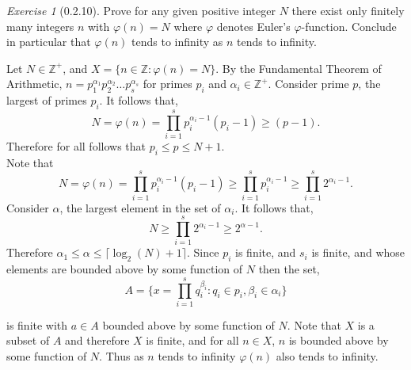 \documentclass[12pt]{amsart}
\makeatletter
\theoremstyle{remark}
\newtheorem*{exercise}{Exercise}%
\def\ZZ{\ensuremath{\mathbb Z}}
\renewenvironment{proof}[1][\proofname]{\par\doublespacing
  \pushQED{\qed}%
  \normalfont \topsep6\p@\@plus6\p@\relax
  \list{}{%
    \settowidth{\leftmargin}{\itshape\proofname:\hskip\labelsep}%
    \setlength{\labelwidth}{0pt}%
    \setlength{\itemindent}{-\leftmargin}%
  }%
  \item[\hskip\labelsep\itshape#1\@addpunct{:}]\ignorespaces
}{%
  \popQED\endlist\@endpefalse
  \singlespacing
}
\theoremstyle{mycomment}
\makeatother
\begin{document}
 
  \begin{exercise}[0.2.10] Prove for any given positive integer $N$ there exist only finitely many integers $n$ 
    with $\varphi(n) = N$ where $\varphi$ denotes Euler's $\varphi$-function. Conclude in particular that 
    $\varphi(n)$ tends to infinity as $n$ tends to infinity.
    \begin{proof} 
      Let $N \in \ZZ^{+}$, and $X = \{n \in \ZZ: \varphi(n) = N\}$. By the Fundamental Theorem of Arithmetic, $n = p_1^{\alpha_1}p_2^{\alpha_2} \dots p_s^{\alpha_s}$
      for primes $p_i$ and $\alpha_i \in \ZZ^+$. Consider prime $p$, the largest of primes $p_i$. It follows that, 
      \begin{equation*}
        N = \varphi(n) = \prod_{i = 1}^s p_i^{\alpha_i - 1}(p_i - 1) \geq (p - 1).
      \end{equation*}
      Therefore for all follows that $p_i \leq p \leq N+1$.\\

      Note that
      \begin{equation*}
        N = \varphi(n) = \prod_{i = 1}^s p_i^{\alpha_i - 1}(p_i - 1) \geq \prod_{i = 1}^s p_i^{\alpha_i - 1} \geq \prod_{i = 1}^s 2^{\alpha_i - 1}. 
      \end{equation*}
      Consider $\alpha$, the largest element in the set of $\alpha_i$. It follows that, 
      \begin{equation*}
        N \geq \prod_{i = 1}^s 2^{\alpha_i - 1} \geq 2^{\alpha - 1}.
      \end{equation*}
      Therefore $\alpha_1 \leq \alpha \leq \lceil\log_2(N) + 1\rceil$.
      Since $p_i$ is finite, and $s_i$ is finite, and whose elements are bounded above by some function of $N$ then the set,
      \begin{equation*}
      A  = \{x = \prod_{i = 1}^s q_{i}^{\beta_i}: q_i \in p_i, \beta_i \in \alpha_i\}
      \end{equation*} 
      
      is finite with $a \in A$ bounded above by some function of $N$. 
      Note that $X$ is a subset of $A$ and therefore $X$ is finite, and for all $n \in X$, $n$ is bounded above by some function of $N$. Thus as $n$ tends to infinity $\varphi(n)$ also tends to infinity.  
    \end{proof}
    \end{exercise}
\end{document}
